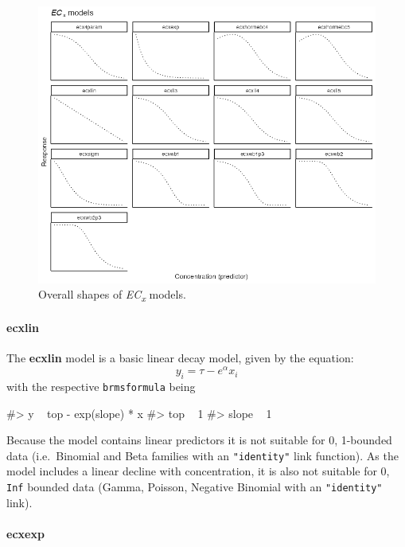 \begin{figure}[ht]
  \centering
  \includegraphics[width=1\textwidth]{../vignettes/vignette-fig-exmp2b-theoretical_ecx_curves.png}
  \captionsetup{justification=justified,format=plain}
  \caption{Overall shapes of  \textit{EC\textsubscript{x}} models.}
  \label{fig1}
\end{figure}

\hypertarget{ecxlin}{%
\paragraph{ecxlin}\label{ecxlin}}

The \textbf{ecxlin} model is a basic linear decay model, given by the
equation: \[y_i = \tau - e^{\alpha} x_i\] with the respective
\texttt{brmsformula} being

\begin{Schunk}
\begin{Soutput}
#> y ~ top - exp(slope) * x 
#> top ~ 1
#> slope ~ 1
\end{Soutput}
\end{Schunk}

Because the model contains linear predictors it is not suitable for 0,
1-bounded data (i.e.~Binomial and Beta families with an
\texttt{"identity"} link function). As the model includes a linear
decline with concentration, it is also not suitable for 0, \texttt{Inf}
bounded data (Gamma, Poisson, Negative Binomial with an
\texttt{"identity"} link).

\hypertarget{ecxexp}{%
\paragraph{ecxexp}\label{ecxexp}}

